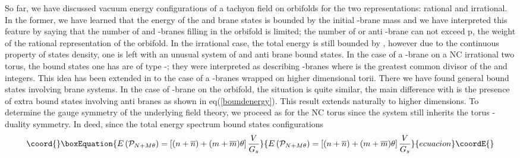 \documentclass[a4paper,12pt]{article}
\begin{document}
So far, we have discussed vacuum energy configurations of a
tachyon field on orbifolds for the two representations: rational
and irrational. In the former, we have learned that the energy of
the \coordHE{} and \coordHE{} brane states is bounded by the initial
\coordHE{}-brane mass \coordHE{} and we have
interpreted this feature by saying that the number of \coordHE{} and \coordHE{}%
-branes filling in the orbifold is limited; the number of \coordHE{} or
anti \coordHE{}-brane can not exceed p, the weight of the rational
representation of the orbifold. In the irrational case, the total
energy is still bounded by \coordHE{}, however due to the continuous
property of states density, one is left with an
unusual system of \coordHE{} and anti \coordHE{} brane bound states. In the case of a \coordHE{}%
-brane on a NC irrational two torus, the bound states one has are
of type \coordHE{}-\coordHE{}; they were interpreted as describing \coordHE{}  \coordHE{}-branes where \coordHE{} is the greatest common divisor of the \coordHE{}
and \coordHE{} integers. This idea has been extended in \cite{j} to the
case of a \coordHE{}-branes wrapped on higher dimensional torii. There we
have found general bound states involving \coordHE{}
 brane systems.
 In the case of \coordHE{}-brane on the \coordHE{}
orbifold, the situation is quite similar, the main difference with \coordHE{} is the presence of extra bound states involving
anti \coordHE{} branes as shown in eq(\ref{boundenergy}). This result
extends naturally to higher dimensions. To determine the gauge
symmetry of the underlying field
theory, we proceed as for the NC torus since the system still inherits the torus \coordHE{}-duality symmetry. In deed, since the total energy spectrum bound states
configurations
\begin{equation}\coord{}\boxEquation{
E\left( \mathcal{P}_{N+M\theta }\right) =\left[ (n+\overline{n})+(m+
\overline{m})\theta \right] \frac{V}{G_{s}}
}{
E\left( \mathcal{P}_{N+M\theta }\right) =\left[ (n+\overline{n})+(m+
\overline{m})\theta \right] \frac{V}{G_{s}}
}{ecuacion}\coordE{}\end{equation}
\end{document}
